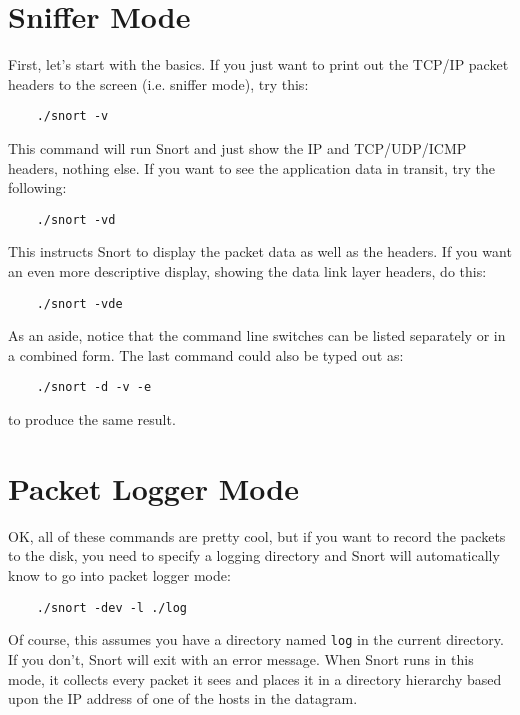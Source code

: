 \documentclass[english]{report}
\begin{document}
\section{Sniffer Mode}

First, let's start with the basics. If you just want to print out the TCP/IP
packet headers to the screen (i.e. sniffer mode), try this:

\begin{verbatim}
    ./snort -v
\end{verbatim}

This command will run Snort and just show the IP and TCP/UDP/ICMP headers,
nothing else. If you want to see the application data in transit, try the
following:

\begin{verbatim}
    ./snort -vd
\end{verbatim}

This instructs Snort to display the packet data as well as the headers.  If you
want an even more descriptive display, showing the data link layer headers, do
this:

\begin{verbatim}
    ./snort -vde
\end{verbatim}

As an aside, notice that the command line switches can be listed separately or
in a combined form. The last command could also be typed out as:

\begin{verbatim}
    ./snort -d -v -e
\end{verbatim}

to produce the same result.

\section{Packet Logger Mode}

OK, all of these commands are pretty cool, but if you want to record the
packets to the disk, you need to specify a logging directory and Snort will
automatically know to go into packet logger mode:

\begin{verbatim}
    ./snort -dev -l ./log
\end{verbatim}

Of course, this assumes you have a directory named \verb!log!  in the current
directory. If you don't, Snort will exit with an error message. When Snort runs
in this mode, it collects every packet it sees and places it in a directory
hierarchy based upon the IP address of one of the hosts in the datagram.
\end{document}
